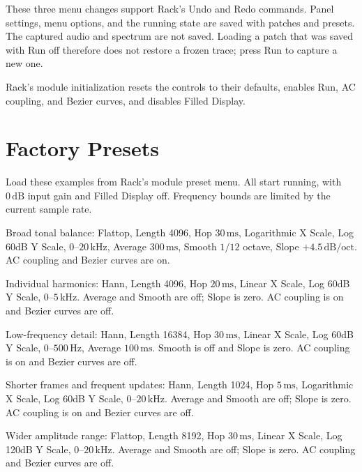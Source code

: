\documentclass[12pt,letterpaper]{article}
\begin{document}
These three menu changes support Rack's Undo and Redo commands. Panel
settings, menu options, and the running state are saved with patches and
presets. The captured audio and spectrum are not saved. Loading a patch
that was saved with Run off therefore does not restore a frozen trace;
press Run to capture a new one.

Rack's module initialization resets the controls to their defaults, enables
Run, AC coupling, and Bezier curves, and disables Filled Display.

\clearpage
\section{Factory Presets}

Load these examples from Rack's module preset menu. All start running,
with $0\,\mathrm{dB}$ input gain and Filled Display off. Frequency bounds
are limited by the current sample rate.

\begin{description}[style=nextline, leftmargin=0pt, labelwidth=0pt, labelsep=0pt]
  \item[Mastering] Broad tonal balance: Flattop, Length 4096, Hop
  $30\,\mathrm{ms}$, Logarithmic X Scale, Log 60dB Y Scale, $0$--$20\,\mathrm{kHz}$,
  Average $300\,\mathrm{ms}$, Smooth $1/12$ octave, Slope
  $+4.5\,\mathrm{dB/oct}$. AC coupling and Bezier curves are on.
  \item[Harmonics] Individual harmonics: Hann, Length 4096, Hop
  $20\,\mathrm{ms}$, Linear X Scale, Log 60dB Y Scale, $0$--$5\,\mathrm{kHz}$.
  Average and Smooth are off; Slope is zero. AC coupling is on and Bezier
  curves are off.
  \item[BassDetail] Low-frequency detail: Hann, Length 16384, Hop
  $30\,\mathrm{ms}$, Linear X Scale, Log 60dB Y Scale, $0$--$500\,\mathrm{Hz}$,
  Average $100\,\mathrm{ms}$. Smooth is off and Slope is zero. AC coupling
  is on and Bezier curves are off.
  \item[Transients] Shorter frames and frequent updates: Hann, Length 1024,
  Hop $5\,\mathrm{ms}$, Logarithmic X Scale, Log 60dB Y Scale,
  $0$--$20\,\mathrm{kHz}$. Average and Smooth are off; Slope is zero.
  AC coupling is on and Bezier curves are off.
  \item[PluginDevelopment] Wider amplitude range: Flattop, Length 8192,
  Hop $30\,\mathrm{ms}$, Linear X Scale, Log 120dB Y Scale,
  $0$--$20\,\mathrm{kHz}$. Average and Smooth are off; Slope is zero.
  AC coupling and Bezier curves are off.
\end{description}
\end{document}
